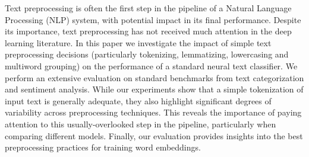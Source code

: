 Text preprocessing is often the first step in the pipeline of a Natural Language Processing (NLP) system, with potential impact in its final performance. Despite its importance, text preprocessing has not received much attention in the deep learning literature. In this paper we investigate the impact of simple text preprocessing decisions (particularly tokenizing, lemmatizing, lowercasing and multiword grouping) on the performance of a standard neural text classifier. We perform an extensive evaluation on standard benchmarks from text categorization and sentiment analysis. While our experiments show that a simple tokenization of input text is generally adequate, they also highlight significant degrees of variability across preprocessing techniques. This reveals the importance of paying attention to this usually-overlooked step in the pipeline, particularly when comparing different models. Finally, our evaluation provides insights into the best preprocessing practices for training word embeddings.
